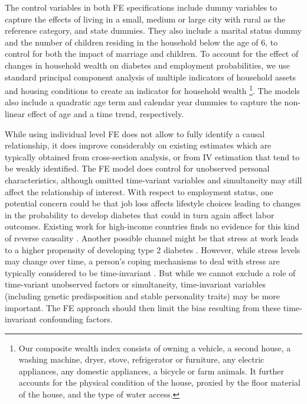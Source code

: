 \documentclass[12pt,english]{article}
\begin{document}
The control variables in both \ac{FE} specifications include dummy variables to capture the effects of living in a small, medium or large city with rural as the reference category, and state dummies. They also include a marital status dummy and the number of children residing in the household below the age of 6, to control for both the impact of marriage and children. To account for the effect of changes in household wealth on diabetes and employment probabilities, we use standard
principal component analysis of multiple indicators of household assets and housing conditions to create an indicator for household wealth \parencite{Filmer2001}\footnote{Our composite wealth index consists of owning a vehicle, a second house, a washing machine, dryer, stove, refrigerator or furniture, any electric appliances, any domestic appliances, a bicycle or farm animals. It further accounts for the physical condition of the house, proxied by the floor material of the house, and the type of water access.}. The models also include a quadratic age term and calendar year dummies to capture the non-linear effect of age and a time trend, respectively.

While using individual level \ac{FE} does not allow to fully identify a causal relationship, it does improve considerably on existing estimates which are typically obtained from cross-section analysis, or from \ac{IV} estimation that tend to be weakly identified.  The FE model does control for unobserved personal characteristics, although omitted time-variant variables and simultaneity may still affect the relationship of interest. With respect to employment status, one potential concern could be that job loss affects lifestyle choices leading to changes in the probability to develop diabetes that could in turn again affect labor outcomes. Existing work for high-income countries finds no evidence for  this kind of reverse causality \parencite{Bergemann2011,Schaller2015}. Another possible channel might be that stress at work leads to a higher propensity of developing type 2 diabetes \parencite{Heraclides2012,Eriksson2013}. However, while stress levels may change over time, a person's coping mechanisms to deal with stress are typically considered to be time-invariant \parencite{Schneiderman2005}. But while we cannot exclude a role of time-variant unobserved factors or simultaneity, time-invariant variables (including genetic predisposition and stable personality traits) may be more important. The \ac{FE} approach should then limit the bias resulting from these time-invariant confounding factors.
\end{document}
